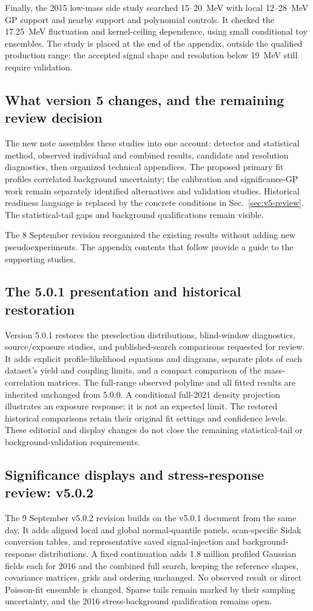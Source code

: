 Finally, the 2015 low-mass side study searched 15--20~MeV with local
12--28~MeV GP support and nearby support and polynomial controls.
It checked the 17.25~MeV fluctuation and kernel-ceiling dependence,
using small conditional toy ensembles. The study is placed at the end
of the appendix, outside the qualified production range: the accepted
signal shape and resolution below 19~MeV still require validation.

\subsection{What version 5 changes, and the remaining review decision}
The new note assembles these studies into one account: detector and
statistical method, observed individual and combined results, candidate
and resolution diagnostics, then organized technical appendices.
The proposed primary fit profiles correlated background uncertainty;
the calibration and significance-GP work remain separately identified
alternatives and validation studies. Historical readiness language is
replaced by the concrete conditions in Sec.~\ref{sec:v5-review}.
The statistical-tail gaps and background qualifications remain visible.

The 8 September revision reorganized the existing results without adding
new pseudoexperiments. The appendix contents that follow provide a guide
to the supporting studies.

\subsection{The 5.0.1 presentation and historical restoration}
Version 5.0.1 restores the preselection distributions, blind-window diagnostics,
source/exposure studies, and published-search comparisons requested for review.
It adds explicit profile-likelihood equations and diagrams, separate plots of
each dataset's yield and coupling limits, and a compact comparison of the
mass-correlation matrices. The full-range observed polyline and all fitted
results are inherited unchanged from 5.0.0. A conditional full-2021 density
projection illustrates an exposure response; it is not an expected limit.
The restored historical comparisons retain their original fit settings and
confidence levels. These editorial and display changes do not close the
remaining statistical-tail or background-validation requirements.

\subsection{Significance displays and stress-response review: v5.0.2}
The 9 September v5.0.2 revision builds on the v5.0.1 document from the same
day. It adds aligned local and global normal-quantile panels, scan-specific
Sidak conversion tables, and representative saved signal-injection and
background-response distributions. A fixed continuation adds 1.8 million
profiled Gaussian fields each for 2016 and the combined full search, keeping
the reference shapes, covariance matrices, grids and ordering unchanged.
No observed result or direct Poisson-fit ensemble is changed. Sparse tails
remain marked by their sampling uncertainty, and the 2016 stress-background
qualification remains open.

